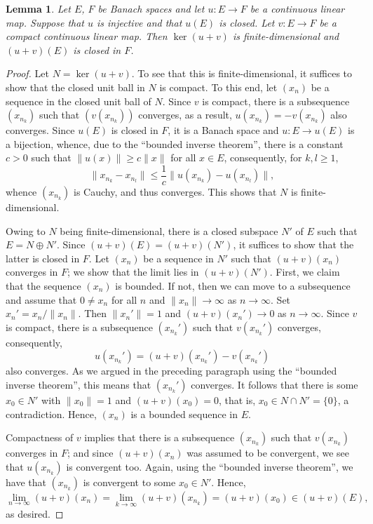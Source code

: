 \documentclass[12pt]{article}
\theoremstyle{thmstyle}
\newtheorem{lemma}[theorem]{Lemma}
\theoremstyle{defstyle}
\renewcommand{\le}{\leqslant}
\renewcommand{\ge}{\geqslant}
\begin{document}
\begin{lemma}
    Let $E$, $F$ be Banach spaces and let $u: E\to F$ be a continuous linear map. Suppose that $u$ is injective and that $u(E)$ is closed. Let $v: E\to F$ be a compact continuous linear map. Then $\ker(u + v)$ is finite-dimensional and $(u + v)(E)$ is closed in $F$.
\end{lemma}
\begin{proof}
    Let $N = \ker(u + v)$. To see that this is finite-dimensional, it suffices to show that the closed unit ball in $N$ is compact. To this end, let $(x_n)$ be a sequence in the closed unit ball of $N$. Since $v$ is compact, there is a subsequence $(x_{n_k})$ such that $\left(v(x_{n_k})\right)$ converges, as a result, $u(x_{n_k}) = -v(x_{n_k})$ also converges. Since $u(E)$ is closed in $F$, it is a Banach space and $u: E\to u(E)$ is a bijection, whence, due to the ``bounded inverse theorem'', there is a constant $c > 0$ such that $\|u(x)\|\ge c\|x\|$ for all $x\in E$, consequently, for $k,l\ge 1$, 
    \begin{equation*}
        \|x_{n_k} - x_{n_l}\|\le\frac{1}{c}\|u(x_{n_k}) - u(x_{n_l})\|,
    \end{equation*}
    whence $(x_{n_k})$ is Cauchy, and thus converges. This shows that $N$ is finite-dimensional.

    Owing to $N$ being finite-dimensional, there is a closed subspace $N'$ of $E$ such that $E = N\oplus N'$. Since $(u + v)(E) = (u + v)(N')$, it suffices to show that the latter is closed in $F$. Let $(x_n)$ be a sequence in $N'$ such that $(u + v)(x_n)$ converges in $F$; we show that the limit lies in $(u + v)(N')$. First, we claim that the sequence $(x_n)$ is bounded. If not, then we can move to a subsequence and assume that $0\ne x_n$ for all $n$ and $\|x_n\|\to\infty$ as $n\to\infty$. Set $x_n' = x_n/\|x_n\|$. Then $\|x_n'\| = 1$ and $(u + v)(x_n')\to 0$ as $n\to\infty$. Since $v$ is compact, there is a subsequence $(x_{n_k}')$ such that $v(x_{n_k}')$ converges, consequently, 
    \begin{equation*}
        u(x_{n_k}') = (u + v)(x_{n_k}') - v(x_{n_k}')
    \end{equation*}
    also converges. As we argued in the preceding paragraph using the ``bounded inverse theorem'', this means that $(x_{n_k}')$ converges. It follows that there is some $x_0\in N'$ with $\|x_0\| = 1$ and $(u + v)(x_0) = 0$, that is, $x_0\in N\cap N' = \{0\}$, a contradiction. Hence, $(x_n)$ is a bounded sequence in $E$.

    Compactness of $v$ implies that there is a subsequence $(x_{n_k})$ such that $v(x_{n_k})$ converges in $F$; and since $(u + v)(x_n)$ was assumed to be convergent, we see that $u(x_{n_k})$ is convergent too. Again, using the ``bounded inverse theorem'', we have that $(x_{n_k})$ is convergent to some $x_0\in N'$. Hence, 
    \begin{equation*}
        \lim_{n\to\infty} (u + v)(x_n) = \lim_{k\to\infty}(u + v)(x_{n_k}) = (u + v)(x_0)\in (u + v)(E),
    \end{equation*}
    as desired.
\end{proof}
\end{document}
